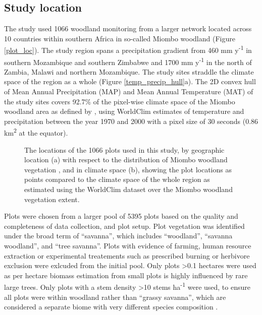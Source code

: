\documentclass[11pt,a4paper]{article}
\begin{document}
\subsection{Study location}

The study used 1066 woodland monitoring from a larger network located across 10 countries within southern Africa in so-called Miombo woodland (Figure \ref{plot_loc}). The study region spans a precipitation gradient from \textapprox{}460 mm y\textsuperscript{-1} in southern Mozambique and southern Zimbabwe and \textapprox{}1700 mm y\textsuperscript{-1} in the north of Zambia, Malawi and northern Mozambique. The study sites straddle the climate space of the region as a whole (Figure \ref{temp_precip_hull}a). The 2D convex hull of Mean Annual Precipitation (MAP) and Mean Annual Temperature (MAT) of the study sites covers 92.7\% of the pixel-wise climate space of the Miombo woodland area as defined by \citet{White}, using WorldClim estimates of temperature and precipitation between the year 1970 and 2000 with a pixel size of 30 seconds (0.86 km\textsuperscript{2} at the equator). 

\begin{figure}[H]
	\centering
    \qquad
    \caption{The locations of the 1066 plots used in this study, by geographic location (a) with respect to the distribution of Miombo woodland vegetation \citep{White}, and in climate space (b), showing the plot locations as points compared to the climate space of the whole region as estimated using the WorldClim dataset over the Miombo woodland vegetation extent.}
\end{figure}

Plots were chosen from a larger pool of 5395 plots based on the quality and completeness of data collection, and plot setup. Plot vegetation was identified under the broad term of ``savanna'', which includes ``woodland'', ``savanna woodland'', and ``tree savanna''. Plots with evidence of farming, human resource extraction or experimental treatements such as prescribed burning or herbivore exclusion were exlcuded from the initial pool. Only plots \textgreater{}0.1 hectares were used as per hectare biomass estimation from small plots is highly influenced by rare large trees. Only plots with a stem density \textgreater{}10 stems ha\textsuperscript{-1} were used, to ensure all plots were within woodland rather than ``grassy savanna'', which are considered a separate biome with very different species composition \citep{Parr2014}.
\end{document}
